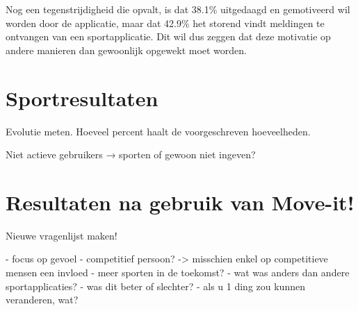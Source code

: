 Nog een tegenstrijdigheid die opvalt, is dat 38.1\% uitgedaagd en gemotiveerd wil worden door de applicatie, maar dat 42.9\% het storend vindt meldingen te ontvangen van een sportapplicatie. Dit wil dus zeggen dat deze motivatie op andere manieren dan gewoonlijk opgewekt moet worden.

\section{Sportresultaten}

Evolutie meten. Hoeveel percent haalt de voorgeschreven hoeveelheden.

Niet actieve gebruikers → sporten of gewoon niet ingeven?

\section{Resultaten na gebruik van Move-it!}

Nieuwe vragenlijst maken!

- focus op gevoel
- competitief persoon? -> misschien enkel op competitieve mensen een invloed
- meer sporten in de toekomst?
- wat was anders dan andere sportapplicaties?
    - was dit beter of slechter?
- als u 1 ding zou kunnen veranderen, wat?